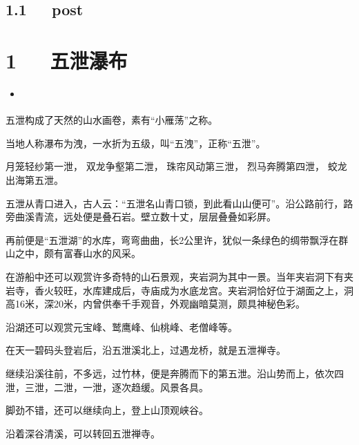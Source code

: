 \documentclass[letterpaper,12pt,english]{sphinxmanual}
\begin{document}
\section{1.1   post}
\label{\detokenize{p03_u65c5_u6e38/Hello_uff0cp03_u65c5_u6e38:post}}

\chapter{1   五泄瀑布}
\label{\detokenize{p03_u65c5_u6e38/_u4e94_u6cc4_u7011_u5e03:id1}}\label{\detokenize{p03_u65c5_u6e38/_u4e94_u6cc4_u7011_u5e03::doc}}
\begin{sphinxShadowBox}
\begin{itemize}
\item {} 
\label{\detokenize{p03_u65c5_u6e38/_u4e94_u6cc4_u7011_u5e03:id3}}{\hyperref[\detokenize{p03_u65c5_u6e38/_u4e94_u6cc4_u7011_u5e03:id1}]{}}

\end{itemize}
\end{sphinxShadowBox}

五泄构成了天然的山水画卷，素有“小雁荡”之称。

当地人称瀑布为洩，一水折为五级，叫“五洩”，正称“五泄”。

月笼轻纱第一泄，
双龙争壑第二泄，
珠帘风动第三泄，
烈马奔腾第四泄，
蛟龙出海第五泄。

五泄从青口进入，古人云：“五泄名山青口锁，到此看山山便可”。沿公路前行，路旁曲溪青流，远处便是叠石岩。壁立数十丈，层层叠叠如彩屏。

再前便是“五泄湖”的水库，弯弯曲曲，长2公里许，犹似一条绿色的绸带飘浮在群山之中，颇有富春山水的风采。

在游船中还可以观赏许多奇特的山石景观，夹岩洞为其中一景。当年夹岩洞下有夹岩寺，香火较旺，水库建成后，寺庙成为水底龙宫。夹岩洞恰好位于湖面之上，洞高16米，深20米，内曾供奉千手观音，外观幽暗莫测，颇具神秘色彩。

沿湖还可以观赏元宝峰、鹫鹰峰、仙桃峰、老僧峰等。

在天一碧码头登岩后，沿五泄溪北上，过遇龙桥，就是五泄禅寺。

继续沿溪往前，不多远，过竹林，便是奔腾而下的第五泄。沿山势而上，依次四泄，三泄，二泄，一泄，逐次趋缓。风景各具。

脚劲不错，还可以继续向上，登上山顶观峡谷。

沿着深谷清溪，可以转回五泄禅寺。
\end{document}
